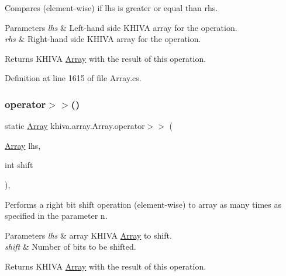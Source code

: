 Compares (element-\/wise) if lhs is greater or equal than rhs. 


\begin{DoxyParams}{Parameters}
{\em lhs} & Left-\/hand side K\+H\+I\+VA array for the operation.\\
\hline
{\em rhs} & Right-\/hand side K\+H\+I\+VA array for the operation.\\
\hline
\end{DoxyParams}
\begin{DoxyReturn}{Returns}
K\+H\+I\+VA \mbox{\hyperlink{classkhiva_1_1array_1_1_array}{Array}} with the result of this operation.
\end{DoxyReturn}


Definition at line 1615 of file Array.\+cs.

\mbox{\label{classkhiva_1_1array_1_1_array_afa54ea024da0e4af55766a1b23f8e10e}} 
\subsubsection{\texorpdfstring{operator$>$$>$()}{operator>>()}}
{\footnotesize\ttfamily static \mbox{\hyperlink{classkhiva_1_1array_1_1_array}{Array}} khiva.\+array.\+Array.\+operator$>$$>$ (\begin{DoxyParamCaption}\item[{\mbox{\hyperlink{classkhiva_1_1array_1_1_array}{Array}}}]{lhs,  }\item[{int}]{shift }\end{DoxyParamCaption})\hspace{0.3cm}{\ttfamily [inline]}, {\ttfamily [static]}}



Performs a right bit shift operation (element-\/wise) to array as many times as specified in the parameter n. 


\begin{DoxyParams}{Parameters}
{\em lhs} & array K\+H\+I\+VA \mbox{\hyperlink{classkhiva_1_1array_1_1_array}{Array}} to shift.\\
\hline
{\em shift} & Number of bits to be shifted.\\
\hline
\end{DoxyParams}
\begin{DoxyReturn}{Returns}
K\+H\+I\+VA \mbox{\hyperlink{classkhiva_1_1array_1_1_array}{Array}} with the result of this operation.
\end{DoxyReturn}


